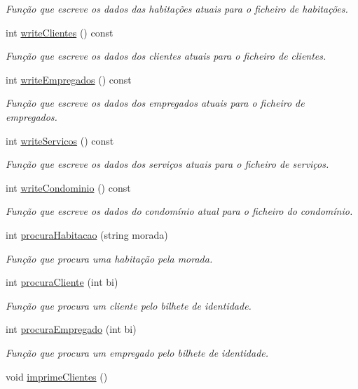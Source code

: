 \begin{DoxyCompactItemize}
\begin{DoxyCompactList}\small\item\em Função que escreve os dados das habitações atuais para o ficheiro de habitações. \end{DoxyCompactList}\item 
int \hyperlink{class_interface_ad63cc6ff5e0baa2b573b3b93cee7174d}{write\+Clientes} () const 
\begin{DoxyCompactList}\small\item\em Função que escreve os dados dos clientes atuais para o ficheiro de clientes. \end{DoxyCompactList}\item 
int \hyperlink{class_interface_ab5dc99f6bfd88e85453e5f2ade5e80bc}{write\+Empregados} () const 
\begin{DoxyCompactList}\small\item\em Função que escreve os dados dos empregados atuais para o ficheiro de empregados. \end{DoxyCompactList}\item 
int \hyperlink{class_interface_a524065bac4da7d0e09bc0bfe1f64064b}{write\+Servicos} () const 
\begin{DoxyCompactList}\small\item\em Função que escreve os dados dos serviços atuais para o ficheiro de serviços. \end{DoxyCompactList}\item 
int \hyperlink{class_interface_a44558531036a12acb14e886e48ffffce}{write\+Condominio} () const 
\begin{DoxyCompactList}\small\item\em Função que escreve os dados do condomínio atual para o ficheiro do condomínio. \end{DoxyCompactList}\item 
int \hyperlink{class_interface_ac6040bbfe9d93dbe66073486895b350f}{procura\+Habitacao} (string morada)
\begin{DoxyCompactList}\small\item\em Função que procura uma habitação pela morada. \end{DoxyCompactList}\item 
int \hyperlink{class_interface_af478030a7565af1f96580afaafdd0cde}{procura\+Cliente} (int bi)
\begin{DoxyCompactList}\small\item\em Função que procura um cliente pelo bilhete de identidade. \end{DoxyCompactList}\item 
int \hyperlink{class_interface_a3f5893a482f5a1b2161dfcea02b79746}{procura\+Empregado} (int bi)
\begin{DoxyCompactList}\small\item\em Função que procura um empregado pelo bilhete de identidade. \end{DoxyCompactList}\item 
void \hyperlink{class_interface_adc4b93f87de9383d2d450435f38de4b3}{imprime\+Clientes} ()\hypertarget{class_interface_adc4b93f87de9383d2d450435f38de4b3}{}\label{class_interface_adc4b93f87de9383d2d450435f38de4b3}


\end{DoxyCompactItemize}
